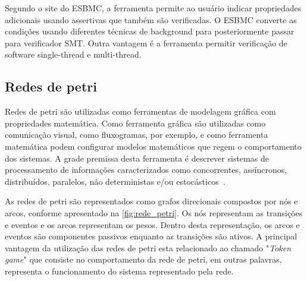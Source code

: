 \par
Segundo o site do ESBMC\cite{esbmc}, a ferramenta permite ao usuário indicar propriedades adicionais usando assertivas que também são verificadas. O ESBMC converte as condições usando diferentes técnicas de background para posteriormente passar para verificador SMT. Outra vantagem é a ferramenta permitir verificação de software single-thread e multi-thread.


\subsection{Redes de petri}



Redes de petri são utilizadas como ferramentas de modelagem gráfica com propriedades matemática. Como ferramenta gráfica são utilizadas como comunicação visual, como fluxogramas, por exemplo, e como ferramenta matemática podem configurar modelos matemáticos que regem o comportamento dos sistemas. A grade premissa desta ferramenta é descrever sistemas de processamento de informações caracterizados como concorrentes, assíncronos, distribuídos, paralelos, não deterministas e/ou estocásticos~\cite{murata1989petri}.

\par
As redes de petri são representados como grafos direcionais compostos por nós e arcos, conforme apresentado na \autoref{fig:rede_petri}. Os nós representam as transições e eventos e os arcos representam os pesos. Dentro desta representação, os arcos e eventos são componentes passivos enquanto as transições são ativos. A principal vantagem da utilização das redes de petri esta relacionado ao chamado "\textit{Token game}" que consiste no comportamento da rede de petri, em outras palavras, representa o funcionamento do sistema representado pela rede\cite{halder2006}.

